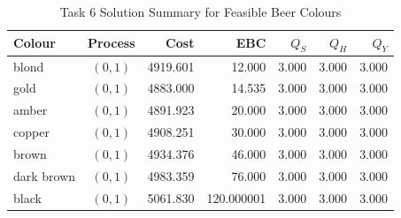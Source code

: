 \begin{table}[H]
\renewcommand{\arraystretch}{1.15}
\caption{Task 6 Solution Summary for Feasible Beer Colours}
\label{tab:task36-solution-summary}
\centering
\small
\begin{tabular}{@{}lcrrrrr@{}}
\toprule
Colour & Process & Cost & EBC & $Q_S$ & $Q_H$ & $Q_Y$ \\
\midrule
blond & $(0,1)$ & 4919.601 & 12.000 & 3.000 & 3.000 & 3.000 \\
gold & $(0,1)$ & 4883.000 & 14.535 & 3.000 & 3.000 & 3.000 \\
amber & $(0,1)$ & 4891.923 & 20.000 & 3.000 & 3.000 & 3.000 \\
copper & $(0,1)$ & 4908.251 & 30.000 & 3.000 & 3.000 & 3.000 \\
brown & $(0,1)$ & 4934.376 & 46.000 & 3.000 & 3.000 & 3.000 \\
dark brown & $(0,1)$ & 4983.359 & 76.000 & 3.000 & 3.000 & 3.000 \\
black & $(0,1)$ & 5061.830 & 120.000001 & 3.000 & 3.000 & 3.000 \\
\bottomrule
\end{tabular}
\end{table}
